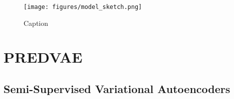 \begin{figure*}[t!]
    \centering
    \texttt{[image: figures/model\_sketch.png]}
    \caption{Caption}
    \label{fig:sketch}
\end{figure*}

\section{PREDVAE}
\label{sec:methods}





\subsection{Semi-Supervised Variational Autoencoders}
\label{subsec:ssvae}

